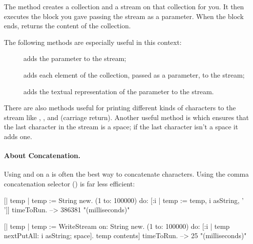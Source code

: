 \documentclass[a4paper,10pt,twoside]{book}
\begin{document}

The method  \label{sec:streamContents} creates a collection and a stream on
that collection for you.
It then executes the block you gave passing the stream as a parameter.
When the block ends,  returns the content of the collection.

The following  methods are especially useful in this context:

\begin{description}
\item[] adds the parameter to the stream;
\item[] adds each element of the collection, passed as a
  parameter, to the stream;
\item[] adds the textual representation of the parameter to the
  stream.
\end{description}

There are also methods useful for printing different kinds of characters to the stream like , , and  (carriage return).
Another useful method is  which ensures that the last character in the stream is a space; if the last character isn't a space it adds one.

\paragraph{About Concatenation.}
Using  and  on a  is often the best way to concatenate characters.
Using the comma concatenation selector () is far less efficient:

\begin{code}{}
[| temp |
  temp := String new.
  (1 to: 100000) do: [:i |
    temp := temp, i asString, ' ']] timeToRun. --> 386381 "(milliseconds)"

[| temp |
  temp := WriteStream on: String new.
  (1 to: 100000) do: [:i |
    temp nextPutAll: i asString; space].
  temp contents] timeToRun. --> 25 "(milliseconds)"
\end{code}
\end{document}
